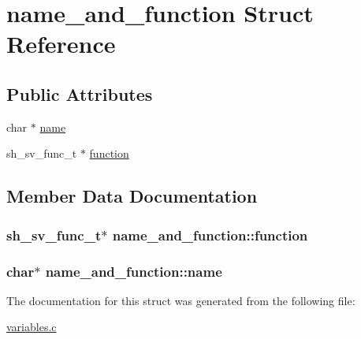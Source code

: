 \hypertarget{structname__and__function}{}\section{name\+\_\+and\+\_\+function Struct Reference}
\label{structname__and__function}
\subsection*{Public Attributes}
\begin{DoxyCompactItemize}
\item 
char $\ast$ \hyperlink{structname__and__function_a5a8e9c2c5166f39ec782baf0776fb902}{name}
\item 
sh\+\_\+sv\+\_\+func\+\_\+t $\ast$ \hyperlink{structname__and__function_a4cee9ba9ff7df61954782ef6f0ffddb3}{function}
\end{DoxyCompactItemize}


\subsection{Member Data Documentation}
\subsubsection[{\texorpdfstring{function}{function}}]{\setlength{\rightskip}{0pt plus 5cm}sh\+\_\+sv\+\_\+func\+\_\+t$\ast$ name\+\_\+and\+\_\+function\+::function}\hypertarget{structname__and__function_a4cee9ba9ff7df61954782ef6f0ffddb3}{}\label{structname__and__function_a4cee9ba9ff7df61954782ef6f0ffddb3}
\subsubsection[{\texorpdfstring{name}{name}}]{\setlength{\rightskip}{0pt plus 5cm}char$\ast$ name\+\_\+and\+\_\+function\+::name}\hypertarget{structname__and__function_a5a8e9c2c5166f39ec782baf0776fb902}{}\label{structname__and__function_a5a8e9c2c5166f39ec782baf0776fb902}


The documentation for this struct was generated from the following file\+:\begin{DoxyCompactItemize}
\item 
\hyperlink{variables_8c}{variables.\+c}\end{DoxyCompactItemize}
